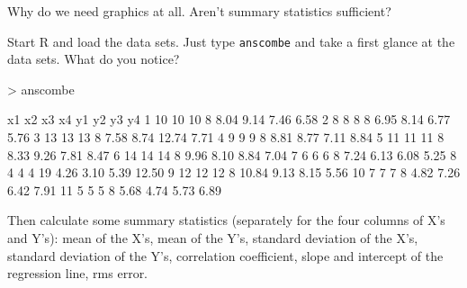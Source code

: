 \documentclass[12pt,letterpaper,final]{article}
\begin{document}
Why do we need graphics at all. Aren't summary statistics sufficient? 

Start R and load the \citet{Ans73} data sets. Just type \verb|anscombe|
and take a first glance at the data sets. What do you notice?
\begin{Schunk}
\begin{Sinput}
> anscombe
\end{Sinput}
\begin{Soutput}
   x1 x2 x3 x4    y1   y2    y3    y4
1  10 10 10  8  8.04 9.14  7.46  6.58
2   8  8  8  8  6.95 8.14  6.77  5.76
3  13 13 13  8  7.58 8.74 12.74  7.71
4   9  9  9  8  8.81 8.77  7.11  8.84
5  11 11 11  8  8.33 9.26  7.81  8.47
6  14 14 14  8  9.96 8.10  8.84  7.04
7   6  6  6  8  7.24 6.13  6.08  5.25
8   4  4  4 19  4.26 3.10  5.39 12.50
9  12 12 12  8 10.84 9.13  8.15  5.56
10  7  7  7  8  4.82 7.26  6.42  7.91
11  5  5  5  8  5.68 4.74  5.73  6.89
\end{Soutput}
\end{Schunk}

Then calculate some summary statistics (separately for the 
four columns of X's and Y's):
mean of the X's, mean of the Y's, 
standard deviation of the X's, standard deviation of the Y's,
correlation coefficient,
slope and intercept of the regression line, rms error.

\end{document}
